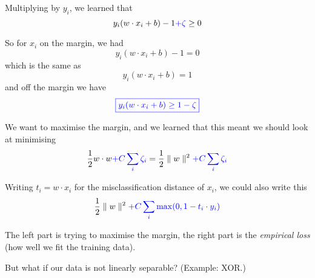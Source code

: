Multiplying by $y_i$, we learned that
\begin{displaymath}
  y_i(w\cdot x_i + b) - 1 \textcolor{blue}{+ \zeta} \ge 0
\end{displaymath}

So for $x_i$ on the margin, we had
\begin{displaymath}
  \boxed{y_i(w\cdot x_i + b) - 1 = 0}
\end{displaymath}
which is the same as
\begin{displaymath}
  \boxed{y_i(w\cdot x_i + b) = 1}
\end{displaymath}
and off the margin we have
\begin{displaymath}
  \textcolor{blue}{\boxed{y_i(w\cdot x_i + b) \ge 1-\zeta}}
\end{displaymath}

We want to maximise the margin, and we learned that this meant we
should look at minimising
\begin{displaymath}
  \frac 12 w\cdot w \textcolor{blue}{+ C\sum_i \zeta_i}
  = \frac 12 \parallel w \parallel^2 \textcolor{blue}{+ C\sum_i \zeta_i}
\end{displaymath}

Writing $t_i = w\cdot x_i$ for the misclassification distance of $x_i$, we could also write this
\begin{displaymath}
  \frac 12 \parallel w \parallel^2 \textcolor{blue}{+ C\sum_i \max(0, 1-t_i\cdot y_i)}
\end{displaymath}


The left part is trying to maximise the margin, the right part is the
\textit{empirical loss} (how well we fit the training data).





But what if our data is not linearly separable?  (Example: XOR.)

